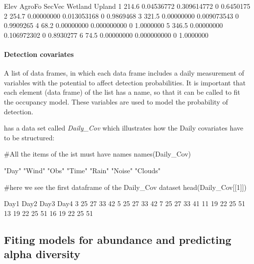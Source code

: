 \documentclass[article]{jss}
\begin{document}
\begin{CodeChunk}
\begin{CodeOutput}
   Elev     AgroFo      SecVec Wetland    Upland
1 214.6 0.04536772 0.309614772       0 0.6450175
2 254.7 0.00000000 0.013053168       0 0.9869468
3 321.5 0.00000000 0.009073543       0 0.9909265
4  68.2 0.00000000 0.000000000       0 1.0000000
5 346.5 0.00000000 0.106972302       0 0.8930277
6  74.5 0.00000000 0.000000000       0 1.0000000
\end{CodeOutput}
\end{CodeChunk}

\paragraph{Detection covariates}\label{detection-covariates}

A list of data frames, in which each data frame includes a daily
measurement of variables with the potential to affect detection
probabilities. It is important that each element (data frame) of the
list has a name, so that it can be called to fit the occupancy model.
These variables are used to model the probability of detection.

 has a data set called \emph{Daily\_Cov} which
illustrates how the Daily covariates have to be structured:

\begin{CodeChunk}
\begin{CodeInput}
#All the items of the ist must have names
names(Daily_Cov)
\end{CodeInput}
\begin{CodeOutput}
[1] "Day"    "Wind"   "Obs"    "Time"   "Rain"   "Noise"  "Clouds"
\end{CodeOutput}
\begin{CodeInput}
#here we see the first dataframe of the Daily_Cov dataset
head(Daily_Cov[[1]])
\end{CodeInput}
\begin{CodeOutput}
   Day1 Day2 Day3 Day4
3    25   27   33   42
5    25   27   33   42
7    25   27   33   41
11   19   22   25   51
13   19   22   25   51
16   19   22   25   51
\end{CodeOutput}
\end{CodeChunk}

\subsection{Fiting models for abundance and predicting alpha
diversity}\label{fiting-models-for-abundance-and-predicting-alpha-diversity}
\end{document}

